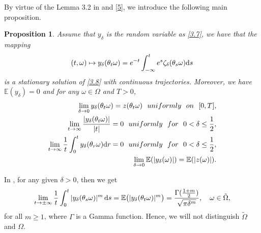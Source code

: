 \documentclass{elsarticle}
\newtheorem{proposition}[theorem]{Proposition}
\theoremstyle{definition}
\numberwithin{equation}{section}
\renewcommand{\d}{{\rm{d}}}
\begin{document}
By virtue of the Lemma 3.2 in \cite{gu2020} and \eqref{5}, we introduce the following main proposition.
\begin{proposition}\label{proposition3.5}
Assume that $y_{\delta}$ is the random variable as \eqref{3.7}, we have that the mapping
 \begin{align}
(t,\omega)\mapsto y_{\delta}(\theta_t\omega)=e^{-t}\int_{-\infty}^te^{ s}\zeta_{\delta}(\theta_s\omega)\d s
  \end{align}
is a stationary solution of \eqref{3.8} with continuous trajectories. Moreover, we have $\mathbb{E}(y_{\delta})=0$ and for any $\omega\in\Omega$ and $T>0$,
 \begin{align}
 \lim\limits_{\delta\rightarrow0}y_{\delta}(\theta_t\omega)=z(\theta_t\omega)~~uniformly~~on~~[0,T],\label{2.4}\\
\lim\limits_{t\rightarrow\infty}\frac{|y_{\delta}(\theta_t\omega)|}{|t|}=0~~uniformly~~for~~0<\delta\leq\frac{1}{2},\\
\lim\limits_{t\rightarrow\infty}\frac{1}{t}\int_0^ty_{\delta}(\theta_r\omega)\d r=0~~uniformly~~for~~0<\delta\leq\frac{1}{2},\\
\lim\limits_{\delta\rightarrow0}\mathbb{E}(|y_{\delta}(\omega)|)=\mathbb{E}(|z(\omega)|)\label{2.5}.
  \end{align}



\end{proposition}



In  \cite{arnold,zhu}, for any given $\delta>0$, then we get
\begin{align} \label{erg}
\lim\limits_{t\rightarrow \pm \infty}\frac{1}{t}\int_0^t|y_{\delta}(\theta_s\omega)|^m\, \d s=\mathbb{E}  \big (|y_{\delta}(\theta_t\omega)|^m
\big) =\frac{\Gamma  (\frac{1+m}{2} )}{\sqrt{\pi\delta^m}}
,\quad \omega\in \tilde \Omega,
\end{align}
for  all $m\geq 1$, where $\Gamma$ is a Gamma function.  Hence, we will not distinguish $\tilde \Omega$ and $\Omega$.
\end{document}
